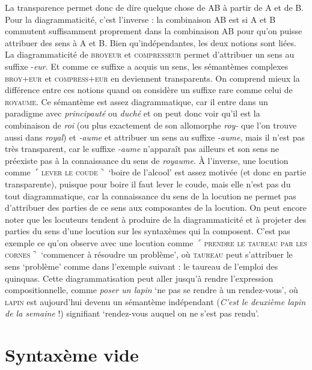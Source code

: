 La transparence permet donc de dire quelque chose de AB à partir de A et de B. Pour la diagrammaticité, c'est l'inverse : la combinaison AB est  si A et B commutent suffisamment proprement dans la combinaison AB pour qu’on puisse attribuer des sens à A et B. Bien qu’indépendantes, les deux notions sont liées. La diagrammaticité de \textsc{broyeur} et \textsc{compresseur} permet d’attribuer un sens au suffixe -\textit{eur}. Et comme ce suffixe a acquis un sens, les sémantèmes complexes \textsc{broy+eur} et \textsc{compress+eur} en deviennent transparents. On comprend mieux la différence entre ces notions quand on considère un suffixe rare comme celui de \textsc{royaume}. Ce sémantème est assez diagrammatique, car il entre dans un paradigme avec \textit{principauté} ou \textit{duché} et on peut donc voir qu’il est la combinaison de \textit{roi} (ou plus exactement de son allomorphe \textit{roy-} que l'on trouve aussi dans \textit{royal}) et \textit{{}-aume} et attribuer un sens au suffixe \textit{{}-aume}, mais il n’est pas très transparent, car le suffixe \textit{{}-aume} n’apparaît pas ailleurs et son sens ne préexiste pas à la connaissance du sens de \textit{royaume}. À l’inverse, une locution comme $⌜$\textsc{lever} \textsc{le} \textsc{coude}$⌝$ ‘boire de l’alcool’ est assez motivée (et donc en partie transparente), puisque pour boire il faut lever le coude, mais elle n’est pas du tout diagrammatique, car la connaissance du sens de la locution ne permet pas d’attribuer des parties de ce sens aux composantes de la locution. On peut encore noter que les locuteurs tendent à produire de la diagrammaticité et à projeter des parties du sens d’une locution sur les syntaxèmes qui la composent. C’est pas exemple ce qu’on observe avec une locution comme $⌜$\textsc{prendre} \textsc{le} \textsc{taureau} \textsc{par} \textsc{les} \textsc{cornes}$⌝$ ‘commencer à résoudre un problème’, où \textsc{taureau} peut s’attribuer le sens ‘problème’ comme dans l’exemple suivant :  le taureau de l’emploi des quinquas. Cette diagrammatisation peut aller jusqu’à rendre l’expression compositionnelle, comme \textit{poser un lapin} ‘ne pas se rendre à un rendez-vous’, où \textsc{lapin} est aujourd’hui devenu un sémantème indépendant (\textit{C’est le deuxième lapin de la semaine} !) signifiant  ‘rendez-vous auquel on ne s'est pas rendu’.

\section{Syntaxème vide}\label{sec:2.3.3}

